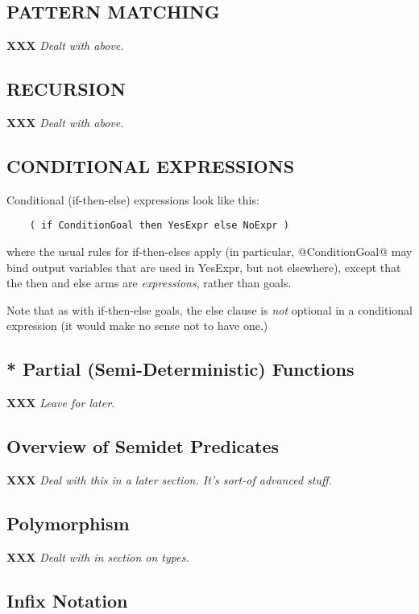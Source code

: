\documentclass[a4paper,11pt,notitlepage,onecolumn]{article}
\newcommand{\XXX}[1]%
{{\small\textbf{XXX} \emph{#1}}}
\begin{document}
\subsection{PATTERN MATCHING}

\XXX{Dealt with above.}

\subsection{RECURSION}

\XXX{Dealt with above.}

\subsection{CONDITIONAL EXPRESSIONS}

Conditional (if-then-else) expressions look like this:
\begin{verbatim}
    ( if ConditionGoal then YesExpr else NoExpr )
\end{verbatim}
where the usual rules for if-then-elses apply (in particular,
@ConditionGoal@ may bind output variables that are used in
YesExpr, but not elsewhere), except that the then and else
arms are \emph{expressions}, rather than goals.

Note that as with if-then-else goals, the else clause is \emph{not}
optional in a conditional expression (it would make no sense
not to have one.)

\subsection{* Partial (Semi-Deterministic) Functions}

\XXX{Leave for later.}

\subsection{Overview of Semidet Predicates}

\XXX{Deal with this in a later section.  It's sort-of advanced
stuff.}

\subsection{Polymorphism}

\XXX{Dealt with in section on types.}

\subsection{Infix Notation}
\end{document}
